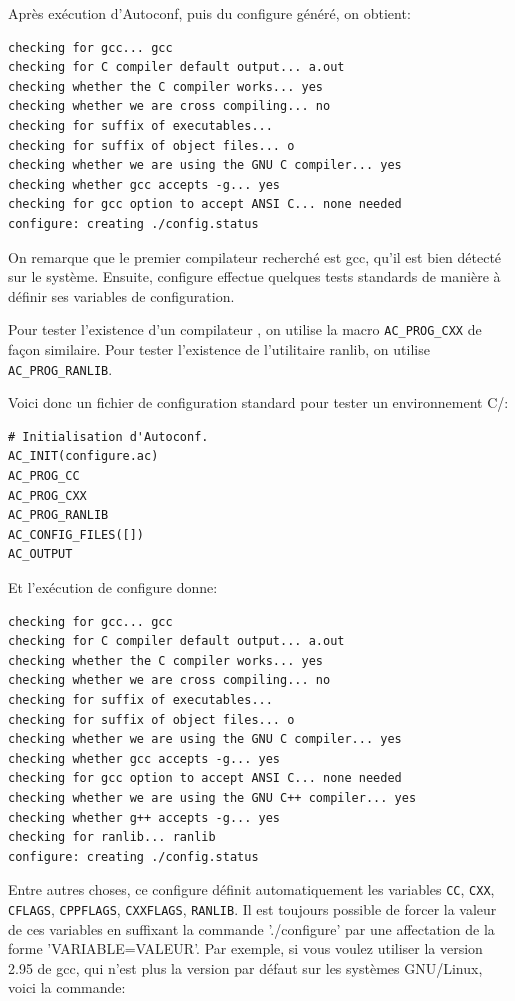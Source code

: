 \documentclass[11pt,a4paper]{article}
\begin{document}
Après exécution d'Autoconf, puis du configure généré, on obtient:
{\small
\begin{verbatim}
checking for gcc... gcc
checking for C compiler default output... a.out
checking whether the C compiler works... yes
checking whether we are cross compiling... no
checking for suffix of executables...
checking for suffix of object files... o
checking whether we are using the GNU C compiler... yes
checking whether gcc accepts -g... yes
checking for gcc option to accept ANSI C... none needed
configure: creating ./config.status
\end{verbatim}
}

On remarque que le premier compilateur recherché est gcc, qu'il est
bien détecté sur le système. Ensuite, configure effectue quelques
tests standards de manière à définir ses variables de configuration.

Pour tester l'existence d'un compilateur \cpp, on utilise la macro
\texttt{AC\_PROG\_\-CXX} de façon similaire. Pour tester l'existence
de l'utilitaire \textsf{ranlib}, on utilise \texttt{AC\_PROG\_RANLIB}.

Voici donc un fichier de configuration standard pour tester un
environnement C/\cpp:
{\small
\begin{verbatim}
# Initialisation d'Autoconf.
AC_INIT(configure.ac)
AC_PROG_CC
AC_PROG_CXX
AC_PROG_RANLIB
AC_CONFIG_FILES([])
AC_OUTPUT
\end{verbatim}
}

Et l'exécution de configure donne:
{\small
\begin{verbatim}
checking for gcc... gcc
checking for C compiler default output... a.out
checking whether the C compiler works... yes
checking whether we are cross compiling... no
checking for suffix of executables...
checking for suffix of object files... o
checking whether we are using the GNU C compiler... yes
checking whether gcc accepts -g... yes
checking for gcc option to accept ANSI C... none needed
checking whether we are using the GNU C++ compiler... yes
checking whether g++ accepts -g... yes
checking for ranlib... ranlib
configure: creating ./config.status
\end{verbatim}
}

Entre autres choses, ce configure définit automatiquement les
variables \texttt{CC}, \texttt{CXX}, \texttt{CFLAGS},
\texttt{CPPFLAGS}, \texttt{CXXFLAGS}, \texttt{RANLIB}. Il est toujours
possible de forcer la valeur de ces variables en suffixant la commande
'./configure' par une affectation de la forme 'VARIABLE=VALEUR'. Par
exemple, si vous voulez utiliser la version 2.95 de gcc, qui n'est
plus la version par défaut sur les systèmes GNU/Linux, voici la
commande:
\end{document}
